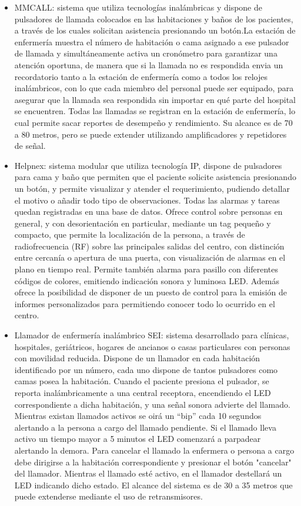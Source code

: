 \begin{itemize}
\item MMCALL: sistema que utiliza tecnologías inalámbricas y dispone de pulsadores de llamada colocados en las habitaciones y baños de los pacientes, a través de los cuales solicitan asistencia presionando un botón.La estación de enfermería muestra el número de habitación o cama asignado a ese pulsador de llamada y simultáneamente activa un cronómetro para garantizar una atención oportuna, de manera que si la llamada no es respondida envia un recordatorio tanto a la estación de enfermería como a todos los relojes inalámbricos, con lo que cada miembro del personal puede ser equipado, para asegurar que la llamada sea respondida sin importar en qué parte del hospital se encuentren. Todas las llamadas se registran en la estación de enfermería, lo cual permite sacar reportes de desempeño y rendimiento. Su alcance es de 70 a 80 metros, pero se puede extender utilizando amplificadores y repetidores de señal.	

\item Helpnex: sistema modular que utiliza tecnología IP, dispone de pulsadores para cama y baño que permiten que el paciente solicite asistencia presionando un botón, y permite visualizar y atender el requerimiento, pudiendo detallar el motivo o añadir todo tipo de observaciones. Todas las alarmas y tareas quedan registradas en una base de datos. Ofrece control sobre personas en general, y con desorientación en particular, mediante un tag pequeño y compacto, que permite la localización de la persona, a través de radiofrecuencia (RF) sobre las principales salidas del centro, con distinción entre cercanía o apertura de una puerta, con visualización de alarmas en el plano en tiempo real. Permite también alarma para pasillo con diferentes códigos de colores, emitiendo indicación sonora y luminosa LED. Además ofrece la posibilidad de disponer de un puesto de control para la emisión de informes personalizados para permitiendo conocer todo lo ocurrido en el centro.

\item Llamador de enfermería inalámbrico SEI: sistema desarrollado para clínicas, hospitales, geriátricos, hogares de ancianos o casas particulares con personas con movilidad reducida. Dispone de un llamador en cada habitación identificado por un número, cada uno dispone de tantos pulsadores como camas posea la habitación. Cuando el paciente presiona el pulsador, se reporta inalámbricamente a una central receptora, encendiendo el LED correspondiente a dicha habitación, y una señal sonora advierte del llamado. Mientras existan llamados activos se oirá un “bip” cada 10 segundos alertando a la persona a cargo del llamado pendiente. Si el llamado lleva activo un tiempo mayor a 5 minutos el LED comenzará a parpadear alertando la demora. Para cancelar el llamado la enfermera o persona a cargo debe dirigirse a la habitación correspondiente y presionar el botón "cancelar" del llamador. Mientras el llamado esté activo, en el llamador destellará un LED indicando dicho estado. El alcance del sistema es de 30 a 35 metros que puede extenderse mediante el uso de retransmisores.

\end{itemize}


